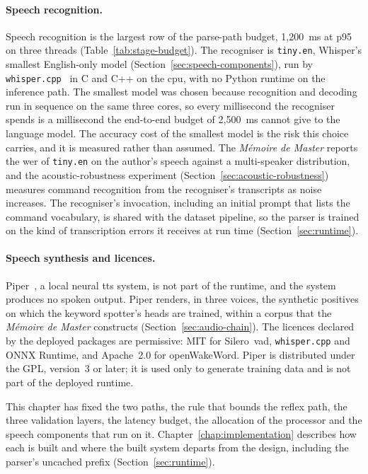 \paragraph{Speech recognition.} Speech recognition is the largest row of the parse-path budget,
1{,}200~ms at p95 on three threads (Table~\ref{tab:stage-budget}). The recogniser is
\texttt{tiny.en}, Whisper's smallest English-only model (Section~\ref{sec:speech-components}), run
by \texttt{whisper.cpp}~\cite{whispercpp} in C and C++ on the \gls{cpu}, with no Python runtime on
the inference path. The smallest model was chosen because recognition and decoding run in sequence on
the same three cores, so every millisecond the recogniser spends is a millisecond the end-to-end
budget of 2{,}500~ms cannot give to the language model. The accuracy cost of the smallest model is
the risk this choice carries, and it is measured rather than assumed. The \emph{M\'emoire de Master}
reports the \gls{wer} of \texttt{tiny.en} on the author's speech against a multi-speaker
distribution, and the acoustic-robustness experiment (Section~\ref{sec:acoustic-robustness})
measures command recognition from the recogniser's transcripts as noise increases. The recogniser's
invocation, including an initial prompt that lists the command vocabulary, is shared with the
dataset pipeline, so the parser is trained on the kind of transcription errors it receives at run
time (Section~\ref{sec:runtime}).

\paragraph{Speech synthesis and licences.} Piper~\cite{piper}, a local neural \gls{tts} system, is
not part of the runtime, and the system produces no spoken output. Piper renders, in three voices,
the synthetic positives on which the keyword spotter's heads are trained, within a corpus that the
\emph{M\'emoire de Master} constructs (Section~\ref{sec:audio-chain}). The licences declared by the
deployed packages are permissive: MIT for Silero~\gls{vad}, \texttt{whisper.cpp} and ONNX Runtime,
and Apache~2.0 for openWakeWord. Piper is distributed under the GPL, version~3 or later; it is used
only to generate training data and is not part of the deployed runtime.

This chapter has fixed the two paths, the rule that bounds the reflex path, the three validation
layers, the latency budget, the allocation of the processor and the speech components that run on
it. Chapter~\ref{chap:implementation} describes how each is built and where the built system departs
from the design, including the parser's uncached prefix (Section~\ref{sec:runtime}).
